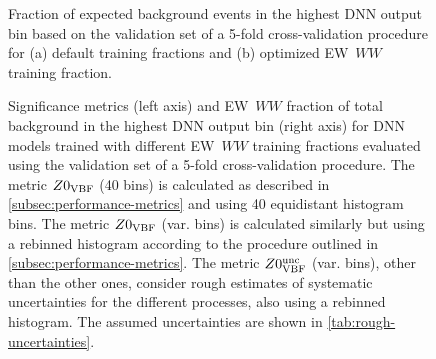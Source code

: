 \begin{figure}[t]
    \caption{Fraction of expected background events in the highest DNN output bin based on the validation set of a 5-fold cross-validation procedure for (a) default training fractions and (b) optimized EW~$WW$ training fraction.}
    \label{fig:bkg-fractions}
\end{figure}

\begin{figure}[t]
    \caption{Significance metrics (left axis) and EW~$WW$ fraction of total background in the highest DNN output bin (right axis) for DNN models trained with different EW~$WW$ training fractions evaluated using the validation set of a 5-fold cross-validation procedure. The metric $Z0_{\mathrm{VBF}}$ (40 bins) is calculated as described in \cref{subsec:performance-metrics} and using 40 equidistant histogram bins. The metric $Z0_{\mathrm{VBF}}$ (var. bins) is calculated similarly but using a rebinned histogram according to the procedure outlined in \cref{subsec:performance-metrics}. The metric $Z0_{\mathrm{VBF}}^{\mathrm{unc}}$ (var. bins), other than the other ones, consider rough estimates of systematic uncertainties for the different processes, also using a rebinned histogram. The assumed uncertainties are shown in \cref{tab:rough-uncertainties}.}
    \label{fig:ew-fraction-scan}
\end{figure}
